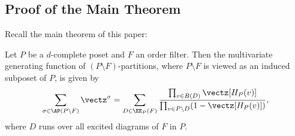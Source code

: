 \subsection{
Proof of the Main Theorem
}

Recall the main theorem of this paper:

\begin{theo}
\label{thm:main1}
Let $P$ be a $d$-complete poset and $F$ an order filter.
Then the multivariate generating function of $(P \setminus F)$-partitions, 
where $P \setminus F$ is viewed as an induced subposet of $P$, is given by
\begin{equation}
\label{eq:main1}
\sum_{\sigma \in \AP(P \setminus F)} \vectz^\sigma
 =
\sum_{D \in \EE_P(F)}
 \frac{ \prod_{v \in B(D)} \vectz[H_P(v)] }
 { \prod_{v \in P \setminus D} ( 1 - \vectz[H_P(v)] ) },
\end{equation}
where $D$ runs over all excited diagrams of $F$ in $P$.
\end{theo}
